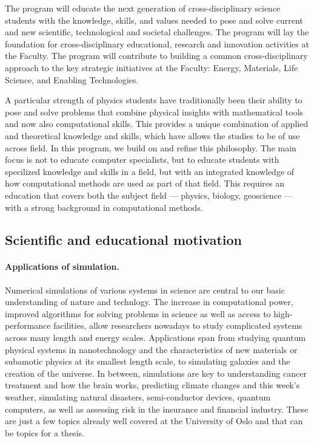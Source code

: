 \documentclass[%
twoside,                 %
final,                   %
10pt]{article}
\begin{document}
The program will educate the next generation of cross-disciplinary science students with the knowledge, skills, and values needed to pose and solve current and new scientific, technological and societal challenges. The program will lay the foundation for cross-disciplinary educational, research and innovation activities at the Faculty. The program will contribute to building a common cross-disciplinary approach to the key strategic initiatives at the Faculty: Energy, Materials, Life Science, and Enabling Technologies. 

A particular strength of physics students have traditionally been their ability to pose and solve problems that combine physical insights with mathematical tools and now also computational skills. This provides a unique combination of applied and theoretical knowledge and skills, which have allows the studies to be of use across field. In this program, we build on and refine this philosophy.  The main focus is not to educate computer specialists, but to educate students with specilized knowledge and skills in a field, but with an integrated knowledge of how computational methods are used as part of that field. This requires an education that covers both the subject field --- physics, biology, geoscience --- with a strong background in computational methods. 

\subsection*{Scientific and educational motivation}


\paragraph{Applications of simulation.}
Numerical simulations of various systems in science are central to our
basic understanding of nature and technlogy.
The increase in computational power,
improved algorithms for solving problems in science as well as access
to high-performance facilities, allow researchers nowadays to study
complicated systems across many length and energy scales. Applications
span from studying quantum physical systems in nanotechnology and the
characteristics of new materials or subamotic physics at its smallest
length scale, to simulating galaxies and the creation of the universe.
In between, simulations are key to understanding
cancer treatment and how the brain works,
predicting climate changes and this week's weather,
simulating natural disasters, semi-conductor devices,
quantum computers, as well as assessing risk in the insurance and
financial industry. These are just a few topics
already well covered at the University of Oslo and that can be
topics for a thesis.
\end{document}
